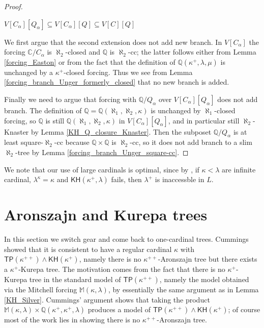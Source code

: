 \documentclass[10pt,reqno]{amsart}
\theoremstyle{plain}
\theoremstyle{definition}
\theoremstyle{remark}
\begin{document}
\begin{proof}
\begin{center}
$V[C_\alpha][Q_\alpha]\subseteq V[C_\alpha][Q]\subseteq V[C][Q]$
\end{center}

We first argue that the second extension does not add new branch. In $V[C_\alpha]$ the forcing $\mathbb{C}/C_\alpha$ is $\aleph_2$-closed and $\mathbb{Q}$ is $\aleph_2$-cc; the latter follows either from Lemma \ref{forcing_Easton} or from the fact that the definition of $\mathbb{Q}(\kappa^+,\lambda,\mu)$ is unchanged by a $\kappa^+$-closed forcing. Thus we see from Lemma \ref{forcing_branch_Unger_formerly_closed} that no new branch is added.

Finally we need to argue that forcing with $\mathbb{Q}/Q_\alpha$ over $V[C_\alpha][Q_\alpha]$ does not add branch. The definition of $\mathbb{Q}=\mathbb{Q}(\aleph_1,\aleph_2,\kappa)$ is unchanged by $\aleph_1$-closed forcing, so $\mathbb{Q}$ is still $\mathbb{Q}(\aleph_1,\aleph_2,\kappa)$ in $V[C_\alpha][Q_\alpha]$, and in particular still $\aleph_2$-Knaster by Lemma \ref{KH_Q_closure_Knaster}. Then the subposet $\mathbb{Q}/Q_\alpha$ is at least square-$\aleph_2$-cc because $\mathbb{Q}\times\mathbb{Q}$ is $\aleph_2$-cc, so it does not add branch to a slim $\aleph_2$-tree by Lemma \ref{forcing_branch_Unger_square-cc}.
\end{proof}

We note that our use of large cardinals is optimal, since by \cite[Lemma 3.1]{friedman-golshani2012independence}, if $\kappa<\lambda$ are infinite cardinal, $\lambda^\kappa=\kappa$ and $\mathsf{KH}(\kappa^+,\lambda)$ fails, then $\lambda^+$ is inaccessble in $L$.






\section{Aronszajn and Kurepa trees}

In this section we switch gear and come back to one-cardinal trees. Cummings \cite{cummings2018aronszajn} showed that it is consistent to have a regular cardinal $\kappa$ with $\mathsf{TP(\kappa^{++})\land\mathsf{KH}(\kappa^+)}$, namely there is no $\kappa^{++}$-Aronszajn tree but there exists a $\kappa^+$-Kurepa tree. The motivation comes from the fact that there is no $\kappa^+$-Kurepa tree in the standard model of $\mathsf{TP}(\kappa^{++})$, namely the model obtained via the Mitchell forcing $\mathbb{M}(\kappa,\lambda)$, by essentially the same argument as in Lemma \ref{KH_Silver}. Cummings' argument shows that taking the product $\mathbb{M}(\kappa,\lambda)\times\mathbb{Q}(\kappa^+,\kappa^+,\lambda)$ produces a model of $\mathsf{TP(\kappa^{++})\land\mathsf{KH}(\kappa^+)}$; of course most of the work lies in showing there is no $\kappa^{++}$-Aronszajn tree.
\end{document}
